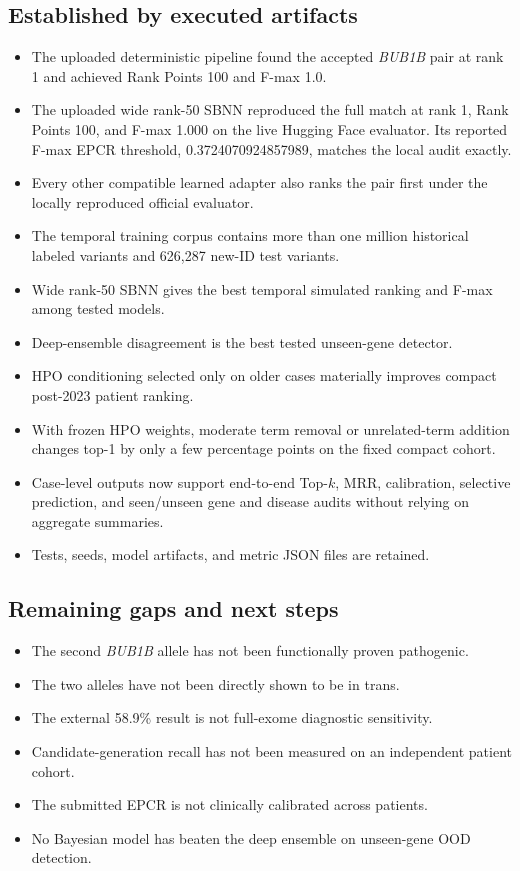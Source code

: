 \documentclass[11pt]{article}
\begin{document}
\subsection{Established by executed artifacts}
\begin{itemize}
\item The uploaded deterministic pipeline found the accepted \textit{BUB1B} pair at rank 1 and achieved Rank Points 100 and F-max 1.0.
\item The uploaded wide rank-50 SBNN reproduced the full match at rank 1, Rank Points 100, and F-max 1.000 on the live Hugging Face evaluator. Its reported F-max EPCR threshold, 0.3724070924857989, matches the local audit exactly.
\item Every other compatible learned adapter also ranks the pair first under the locally reproduced official evaluator.
\item The temporal training corpus contains more than one million historical labeled variants and 626,287 new-ID test variants.
\item Wide rank-50 SBNN gives the best temporal simulated ranking and F-max among tested models.
\item Deep-ensemble disagreement is the best tested unseen-gene detector.
\item HPO conditioning selected only on older cases materially improves compact post-2023 patient ranking.
\item With frozen HPO weights, moderate term removal or unrelated-term addition changes top-1 by only a few percentage points on the fixed compact cohort.
\item Case-level outputs now support end-to-end Top-$k$, MRR, calibration, selective prediction, and seen/unseen gene and disease audits without relying on aggregate summaries.
\item Tests, seeds, model artifacts, and metric JSON files are retained.
\end{itemize}

\subsection{Remaining gaps and next steps}
\begin{itemize}
\item The second \textit{BUB1B} allele has not been functionally proven pathogenic.
\item The two alleles have not been directly shown to be in trans.
\item The external 58.9\% result is not full-exome diagnostic sensitivity.
\item Candidate-generation recall has not been measured on an independent patient cohort.
\item The submitted EPCR is not clinically calibrated across patients.
\item No Bayesian model has beaten the deep ensemble on unseen-gene OOD detection.
\end{itemize}
\end{document}
